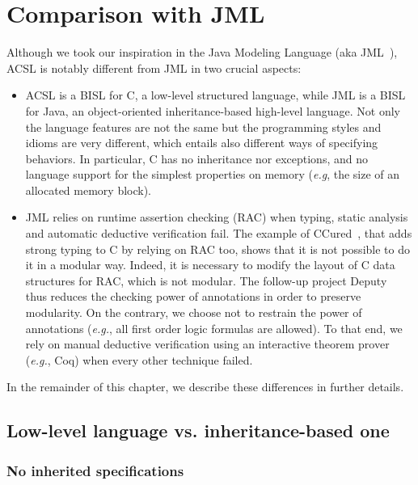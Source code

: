 \section{Comparison with JML}
\label{sec:comp-jml}

Although we took our inspiration in the Java Modeling Language (aka
JML~\cite{jmlhomepage}), ACSL is notably different from JML in
two crucial aspects:

\begin{itemize}
\item ACSL is a BISL for C, a low-level structured language, while JML
  is a BISL for Java, an object-oriented inheritance-based high-level
  language. Not only the language features are not the same but the
  programming styles and idioms are very different, which entails also
  different ways of specifying behaviors. In particular, C has no
  inheritance nor exceptions, and no language support for the simplest
  properties on memory (\emph{e.g}, the size of an allocated memory block).
\item JML relies on runtime assertion checking (RAC) when typing,
  static analysis and automatic deductive verification fail. The
  example of CCured~\cite{necula02ccured,condit03ccured}, that adds
  strong typing to C by relying on RAC too, shows that it is not possible
  to do it in a modular way. Indeed, it is necessary to modify the
  layout of C data structures for RAC, which is not modular. The
  follow-up project Deputy~\cite{condit07deputy} thus reduces the
  checking power of annotations in order to preserve modularity.  On
  the contrary, we choose not to restrain the power of annotations
  (\emph{e.g.}, all first order logic formulas are allowed). To that end, we
  rely on manual deductive verification using an interactive theorem
  prover (\emph{e.g.}, Coq) when every other technique failed.
\end{itemize}

\noindent
In the remainder of this chapter, we describe these differences in
further details.

\subsection{Low-level language vs. inheritance-based one}

\subsubsection*{No inherited specifications}

